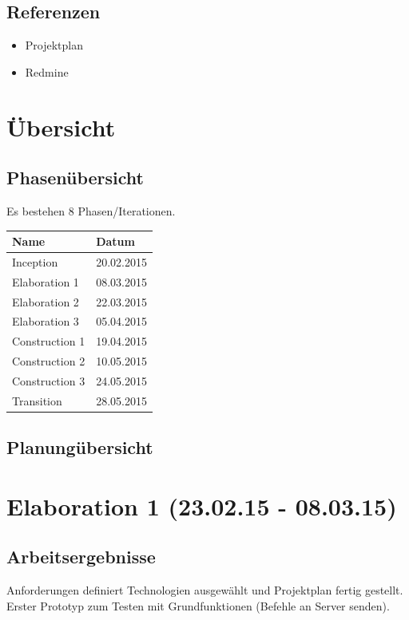 \documentclass[11pt]{scrartcl}
\begin{document}
\subsection{Referenzen}
\begin{itemize}
  \item Projektplan
  \item Redmine
\end{itemize}
\section{Übersicht}
\subsection{Phasenübersicht}
Es bestehen 8 Phasen/Iterationen.
\newline
\begin{tabularx}{\linewidth}{X X}
  \bf{Name} & \bf{Datum} \\
  \hline
  Inception & 20.02.2015 \\
  Elaboration 1 & 08.03.2015 \\
  Elaboration 2 & 22.03.2015 \\
  Elaboration 3 & 05.04.2015 \\
  Construction 1 & 19.04.2015 \\
  Construction 2 & 10.05.2015 \\
  Construction 3 & 24.05.2015 \\
  Transition 	& 28.05.2015 \\
\end{tabularx}
\subsection{Planungübersicht}

\section{Elaboration 1 (23.02.15 - 08.03.15)}
\subsection{Arbeitsergebnisse}
Anforderungen definiert Technologien ausgewählt und Projektplan 
fertig gestellt. \newline Erster Prototyp 
zum Testen mit Grundfunktionen (Befehle an Server senden).
\end{document}

